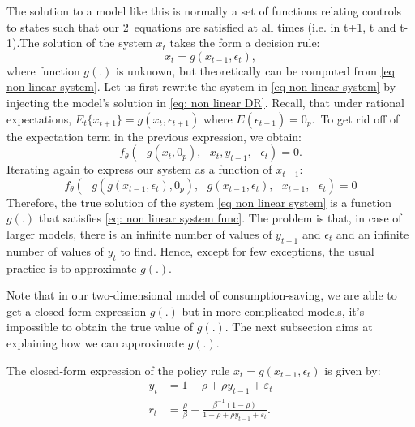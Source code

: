 \documentclass[a4paper,12pt]{article}%
\begin{document}
The solution to a model like this is normally a set of functions relating
controls to states such that our 2\ equations are satisfied at all times (i.e.
in t+1, t and t-1).The solution of the system $x_{t}$ takes the form a
decision rule:
\begin{equation}
x_{t}=g\left(  x_{t-1},\epsilon_{t}\right)  , \label{eq: non linear DR}%
\end{equation}
where function $g(.)$ is unknown, but theoretically can be computed from
\autoref{eq non linear system}. Let us first rewrite the system in
\autoref{eq non linear system} by injecting the model's solution in
\autoref{eq: non linear DR}. Recall, that under rational expectations,
$E_{t}\{x_{t+1}\}=g\left(  x_{t},\epsilon_{t+1}\right)  $ where $E\left(
\epsilon_{t+1}\right)  =0_{p}$.\ To get rid off of the expectation term in the
previous expression, we obtain:%
\begin{equation}
f_{\theta}\left(  \text{ }g\left(  x_{t},0_{p}\right)  ,\text{ }x_{t},\text{
}y_{t-1},\text{ }\epsilon_{t}\right)  =0.
\end{equation}
Iterating again to express our system as a function of $x_{t-1}$:
\begin{equation}
f_{\theta}\left(  \text{ }g\left(  g\left(  x_{t-1},\epsilon_{t}\right)
,0_{p}\right)  ,\text{ }g\left(  x_{t-1},\epsilon_{t}\right)  ,\text{ }%
x_{t-1},\text{ }\epsilon_{t}\right)  =0 \label{eq: non linear system func}%
\end{equation}
Therefore, the true solution of the system \autoref{eq non linear system} is a
function $g(.)$ that satisfies \autoref{eq: non linear system func}. The
problem is that, in case of larger models, there is an infinite number of
values of $y_{t-1}$ and $\epsilon_{t}$ and an infinite number of values of
$y_{t}$ to find. Hence, except for few exceptions, the usual practice is to
approximate $g(.)$.

Note that in our two-dimensional model of consumption-saving, we are able to
get a closed-form expression $g(.)$ but in more complicated models, it's
impossible to obtain the true value of $g(.)$. The next subsection aims at
explaining how we can approximate $g(.)$.

The closed-form expression of the policy rule $x_{t}=g\left(  x_{t-1}%
,\epsilon_{t}\right)  $ is given by:%
\begin{align}
y_{t}  &  =1-\rho+\rho y_{t-1}+\varepsilon_{t}\\
r_{t}  &  =\frac{\rho}{\beta}+\frac{\beta^{-1}\left(  1-\rho\right)  }%
{1-\rho+\rho y_{t-1}+\varepsilon_{t}}.
\end{align}
\end{document}
